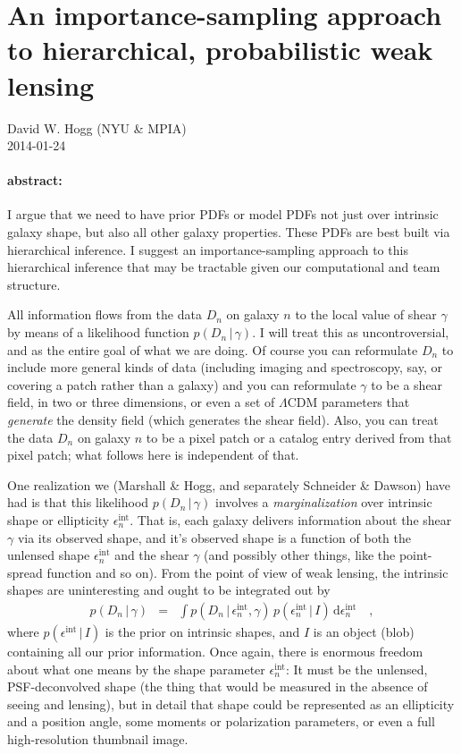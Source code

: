 \documentclass[12pt]{article}
\newcommand{\given}{\,|\,}
\newcommand{\data}{D}
\newcommand{\shear}{\gamma}
\newcommand{\ellip}{\epsilon}
\newcommand{\intrinsic}{\ellip^{\mathrm{int}}}
\newcommand{\prior}{I}
\newcommand{\dd}{\mathrm{d}}
\begin{document}
\sloppy\sloppypar

\section*{An importance-sampling approach\\ to hierarchical, probabilistic weak lensing}

\smallskip\noindent
David W. Hogg (NYU \& MPIA)\\
2014-01-24

\paragraph{abstract:}
I argue that we need to have prior PDFs or model PDFs not just over intrinsic galaxy shape,
  but also all other galaxy properties.
These PDFs are best built via hierarchical inference.
I suggest an importance-sampling approach to this hierarchical inference that may be tractable
  given our computational and team structure.

\bigskip

All information flows from the data $\data_n$ on galaxy $n$ to the local value of shear $\shear$
  by means of a likelihood function $p(\data_n\given\shear)$.
I will treat this as uncontroversial,
  and as the entire goal of what we are doing.
Of course you can reformulate $\data_n$ to include more general kinds of data
  (including imaging and spectroscopy, say, or covering a patch rather than a galaxy)
  and you can reformulate $\gamma$ to be a shear field, in two or three dimensions,
  or even a set of $\Lambda$CDM parameters that \emph{generate} the density field
  (which generates the shear field).
Also, you can treat the data $\data_n$ on galaxy $n$ to be a pixel patch
  or a catalog entry derived from that pixel patch;
  what follows here is independent of that.

One realization we (Marshall \& Hogg, and separately Schneider \& Dawson) have had is
  that this likelihood $p(\data_n\given\shear)$ involves a \emph{marginalization}
  over intrinsic shape or ellipticity $\intrinsic_n$.
That is, each galaxy delivers information about the shear $\gamma$ via its observed shape,
  and it's observed shape is a function of both the unlensed shape $\intrinsic_n$
  and the shear $\gamma$ (and possibly other things, like the point-spread function and so on).
From the point of view of weak lensing, the intrinsic shapes are uninteresting and ought to be integrated out by
\begin{eqnarray}
p(\data_n\given\shear)
  &=& \int p(\data_n\given\intrinsic_n,\shear)\,p(\intrinsic_n\given\prior)\,\dd\intrinsic_n
  \quad ,
\end{eqnarray}
  where $p(\intrinsic\given\prior)$ is the prior on intrinsic shapes,
  and $\prior$ is an object (blob) containing all our prior information.
Once again, there is enormous freedom about what one means by the shape parameter $\intrinsic_n$:
It must be the unlensed, PSF-deconvolved shape
  (the thing that would be measured in the absence of seeing and lensing),
  but in detail that shape could be represented as an ellipticity and a position angle,
  some moments or polarization parameters,
  or even a full high-resolution thumbnail image.
\end{document}
